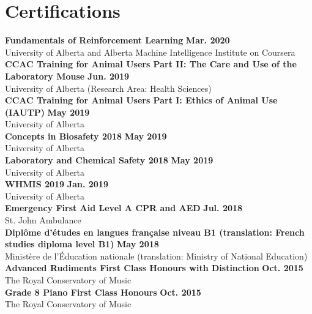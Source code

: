 \documentclass{article}
\begin{document}
\section*{\textcolor{my_red}{Certifications}}
    \textbf{Fundamentals of Reinforcement Learning} \hfill \textbf{Mar. 2020}\\
    University of Alberta and Alberta Machine Intelligence Institute on Coursera\\[0.5em]
    \textbf{CCAC Training for Animal Users Part II: The Care and Use of the Laboratory Mouse} \hfill \textbf{Jun. 2019}\\
    University of Alberta (Research Area: Health Sciences)\\[0.5em]
    \textbf{CCAC Training for Animal Users Part I: Ethics of Animal Use (IAUTP)} \hfill \textbf{May 2019}\\
    University of Alberta\\[0.5em]
    \textbf{Concepts in Biosafety 2018} \hfill \textbf{May 2019}\\
    University of Alberta\\[0.5em]
    \textbf{Laboratory and Chemical Safety 2018} \hfill \textbf{May 2019}\\
    University of Alberta\\[0.5em]
    \textbf{WHMIS 2019} \hfill \textbf{Jan. 2019}\\
    University of Alberta\\[0.5em]
    \textbf{Emergency First Aid Level A CPR and AED} \hfill \textbf{Jul. 2018}\\
    St. John Ambulance\\[0.5em]
    \textbf{Dipl\^ome d'\'etudes en langues fran\c{c}aise niveau B1 (translation: French studies diploma level B1)} \hfill \textbf{May 2018}\\
    Minist\`ere de l'\'Education nationale (translation: Ministry of National Education)\\[0.5em]
    \textbf{Advanced Rudiments First Class Honours with Distinction} \hfill \textbf{Oct. 2015}\\
    The Royal Conservatory of Music\\[0.5em]
    \textbf{Grade 8 Piano First Class Honours} \hfill \textbf{Oct. 2015}\\
    The Royal Conservatory of Music


\end{document}

